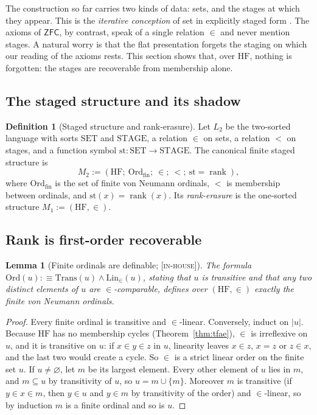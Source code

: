 \documentclass[11pt]{article}
\newcommand{\HF}{\mathrm{HF}}                 \newcommand{\rank}{\operatorname{rank}}
\newcommand{\Ord}{\mathrm{Ord}}
\newcommand{\gradetag}[1]{\textnormal{\textsc{[#1]}}}
\newcommand{\inhouse}{\gradetag{in-house}}
\newtheorem{lemma}[theorem]{Lemma}
\theoremstyle{definition}
\newtheorem{definition}[theorem]{Definition}
\begin{document}
The construction so far carries two kinds of data: sets, and the stages at which they appear.
This is the \emph{iterative conception} of set in explicitly staged form
\citep{Boolos1971,Scott1974,Potter2004}. The axioms of $\mathsf{ZFC}$, by contrast, speak of a
single relation $\in$ and never mention stages. A natural worry is that the flat presentation
forgets the staging on which our reading of the axioms rests. This section shows that, over
$\HF$, nothing is forgotten: the stages are recoverable from membership alone.

\subsection{The staged structure and its shadow}

\begin{definition}[Staged structure and rank-erasure]\label{def:staged}
Let $L_2$ be the two-sorted language with sorts $\mathrm{SET}$ and $\mathrm{STAGE}$, a relation
$\in$ on sets, a relation $<$ on stages, and a function symbol $\mathrm{st}\colon\mathrm{SET}\to
\mathrm{STAGE}$. The canonical finite staged structure is
\[
  M_2:=(\HF;\ \Ord_{\mathrm{fin}};\ \in;\ <;\ \mathrm{st}=\rank),
\]
where $\Ord_{\mathrm{fin}}$ is the set of finite von Neumann ordinals, $<$ is membership between
ordinals, and $\mathrm{st}(x)=\rank(x)$. Its \emph{rank-erasure} is the one-sorted structure
$M_1:=(\HF,\in)$.
\end{definition}

\subsection{Rank is first-order recoverable}

\begin{lemma}[Finite ordinals are definable; \inhouse]\label{lem:orddef}
The formula $\mathrm{Ord}(u):\equiv\mathrm{Trans}(u)\wedge\mathrm{Lin}_\in(u)$, stating that $u$
is transitive and that any two distinct elements of $u$ are $\in$-comparable, defines over
$(\HF,\in)$ exactly the finite von Neumann ordinals.
\end{lemma}

\begin{proof}
Every finite ordinal is transitive and $\in$-linear. Conversely, induct on $|u|$. Because $\HF$ has
no membership cycles (Theorem~\ref{thm:tfae}), $\in$ is irreflexive on $u$, and it is transitive
on $u$: if $x\in y\in z$ in $u$, linearity leaves $x\in z$, $x=z$ or $z\in x$, and the last two
would create a cycle. So $\in$ is a strict linear order on the finite set $u$. If $u\ne\varnothing$,
let $m$ be its largest element. Every other element of $u$ lies in $m$, and $m\subseteq u$ by
transitivity of $u$, so $u=m\cup\{m\}$. Moreover $m$ is transitive (if $y\in x\in m$, then $y\in
u$ and $y\in m$ by transitivity of the order) and $\in$-linear, so by induction $m$ is a finite
ordinal and so is $u$.
\end{proof}
\end{document}
